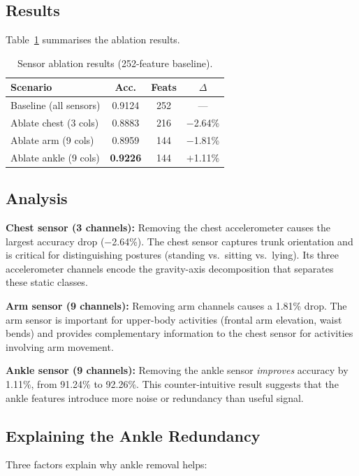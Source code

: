 \documentclass[10pt,twocolumn,letterpaper]{article}
\begin{document}
\subsection{Results}
Table~\ref{tab:ablation} summarises the ablation results.

\begin{table}[H]
\centering
\caption{Sensor ablation results (252-feature baseline).}
\label{tab:ablation}
\small
\begin{tabular}{lccc}
\toprule
\textbf{Scenario} & \textbf{Acc.} & \textbf{Feats} & \textbf{$\Delta$} \\
\midrule
Baseline (all sensors) & 0.9124 & 252 & --- \\
Ablate chest (3 cols)  & 0.8883 & 216 & $-$2.64\% \\
Ablate arm (9 cols)    & 0.8959 & 144 & $-$1.81\% \\
Ablate ankle (9 cols)  & \textbf{0.9226} & 144 & $+$1.11\% \\
\bottomrule
\end{tabular}
\end{table}

\subsection{Analysis}

\textbf{Chest sensor (3 channels):} Removing the chest accelerometer causes the largest accuracy drop ($-$2.64\%). The chest sensor captures trunk orientation and is critical for distinguishing postures (standing vs.\ sitting vs.\ lying). Its three accelerometer channels encode the gravity-axis decomposition that separates these static classes.

\textbf{Arm sensor (9 channels):} Removing arm channels causes a 1.81\% drop. The arm sensor is important for upper-body activities (frontal arm elevation, waist bends) and provides complementary information to the chest sensor for activities involving arm movement.

\textbf{Ankle sensor (9 channels):} Removing the ankle sensor \textit{improves} accuracy by 1.11\%, from 91.24\% to 92.26\%. This counter-intuitive result suggests that the ankle features introduce more noise or redundancy than useful signal.

\subsection{Explaining the Ankle Redundancy}
Three factors explain why ankle removal helps:
\end{document}
